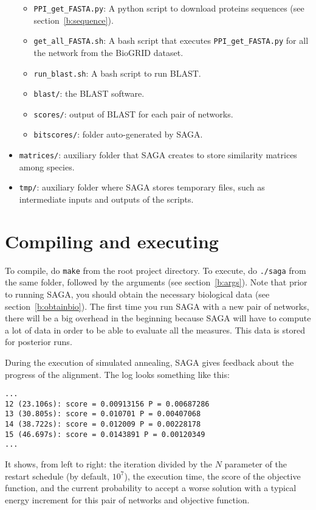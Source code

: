 \documentclass[]{article}
\begin{document}
\begin{itemize}
\begin{itemize}
\item \texttt{PPI\_get\_FASTA.py}: A python script to download proteins sequences (see section~\ref{b:sequence}).
\item\texttt{get\_all\_FASTA.sh}: A bash script that executes \texttt{PPI\_get\_FASTA.py} for all the network from the BioGRID dataset.
\item\texttt{run\_blast.sh}: A bash script to run BLAST.
\item\texttt{blast/}: the BLAST software.
\item\texttt{scores/}: output of BLAST for each pair of networks.
\item\texttt{bitscores/}: folder auto-generated by SAGA.
\end{itemize}
\item\verb|matrices/|: auxiliary folder that SAGA creates to store similarity matrices among species.
\item\verb|tmp/|: auxiliary folder where SAGA stores temporary files, such as intermediate inputs and outputs of the scripts.
\end{itemize}
\section{Compiling and executing}
To compile, do \texttt{make} from the root project directory. To execute, do \texttt{./saga} from the same folder, followed by the arguments (see section~\ref{b:args}). Note that prior to running SAGA, you should obtain the necessary biological data (see section~\ref{b:obtainbio}). The first time you run SAGA with a new pair of networks, there will be a big overhead in the beginning because SAGA will have to compute a lot of data in order to be able to evaluate all the measures. This data is stored for posterior runs.

During the execution of simulated annealing, SAGA gives feedback about the progress of the alignment. The log looks something like this:
\begin{verbatim}
...
12 (23.106s): score = 0.00913156 P = 0.00687286
13 (30.805s): score = 0.010701 P = 0.00407068
14 (38.722s): score = 0.012009 P = 0.00228178
15 (46.697s): score = 0.0143891 P = 0.00120349
...
\end{verbatim}
It shows, from left to right: the iteration divided by the $N$ parameter of the restart schedule (by default, $10^7$), the execution time, the score of the objective function, and the current probability to accept a worse solution with a typical energy increment for this pair of networks and objective function.
 
\end{document}
